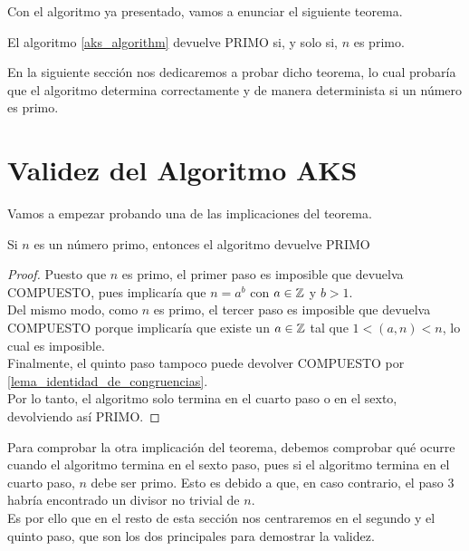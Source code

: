 Con el algoritmo ya presentado, vamos a enunciar el siguiente teorema.

\begin{teorema}\label{validez_algoritmo_aks}
	El algoritmo \autoref{aks_algorithm} devuelve PRIMO si, y solo si, $n$ es primo.
\end{teorema}

En la siguiente sección nos dedicaremos a probar dicho teorema, lo cual probaría que el algoritmo determina correctamente y de manera determinista si un número es primo.

\section{Validez del Algoritmo AKS}

Vamos a empezar probando una de las implicaciones del teorema.

\begin{lema}\label{devuelve_PRIMO_si_n_primo}
	Si $n$ es un número primo, entonces el algoritmo devuelve PRIMO
\end{lema}

\begin{proof}
	Puesto que $n$ es primo, el primer paso es imposible que devuelva COMPUESTO, pues implicaría que $n = a^b$ con $a \in \mathbb{Z}$ y $b > 1$.\\
	
	Del mismo modo, como $n$ es primo, el tercer paso es imposible que devuelva COMPUESTO porque implicaría que existe un $a \in \mathbb{Z}$ tal que $1 < (a, n) < n$, lo cual es imposible.\\
	
	Finalmente, el quinto paso tampoco puede devolver COMPUESTO por \autoref{lema_identidad_de_congruencias}.\\
	
	Por lo tanto, el algoritmo solo termina en el cuarto paso o en el sexto, devolviendo así PRIMO.
\end{proof}

Para comprobar la otra implicación del teorema, debemos comprobar qué ocurre cuando el algoritmo termina en el sexto paso, pues si el algoritmo termina en el cuarto paso, $n$ debe ser primo. Esto es debido a que, en caso contrario, el paso $3$ habría encontrado un divisor no trivial de $n$.\\

Es por ello que en el resto de esta sección nos centraremos en el segundo y el quinto paso, que son los dos principales para demostrar la validez.\\

